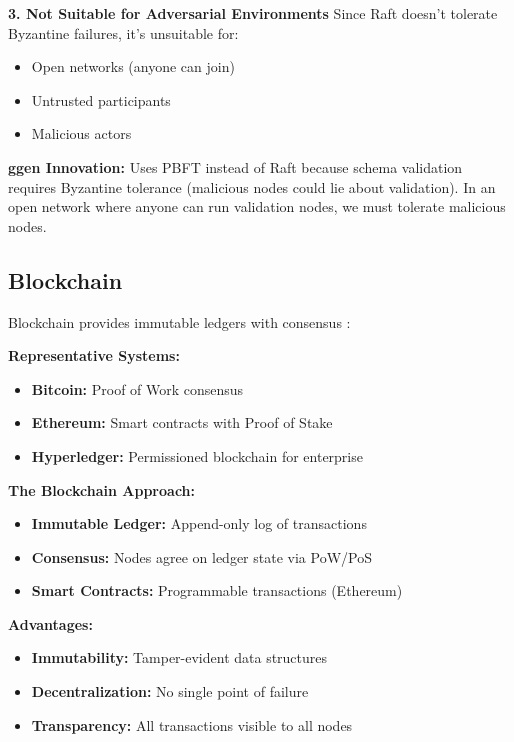 \textbf{3. Not Suitable for Adversarial Environments}
Since Raft doesn't tolerate Byzantine failures, it's unsuitable for:
\begin{itemize}
    \item Open networks (anyone can join)
    \item Untrusted participants
    \item Malicious actors
\end{itemize}

\textbf{ggen Innovation:} Uses PBFT instead of Raft because schema validation requires Byzantine tolerance (malicious nodes could lie about validation). In an open network where anyone can run validation nodes, we must tolerate malicious nodes.

\subsection{Blockchain}

Blockchain provides immutable ledgers with consensus \cite{nakamoto2008bitcoin}:

\textbf{Representative Systems:}
\begin{itemize}
    \item \textbf{Bitcoin:} Proof of Work consensus
    \item \textbf{Ethereum:} Smart contracts with Proof of Stake
    \item \textbf{Hyperledger:} Permissioned blockchain for enterprise
\end{itemize}

\textbf{The Blockchain Approach:}
\begin{itemize}
    \item \textbf{Immutable Ledger:} Append-only log of transactions
    \item \textbf{Consensus:} Nodes agree on ledger state via PoW/PoS
    \item \textbf{Smart Contracts:} Programmable transactions (Ethereum)
\end{itemize}

\textbf{Advantages:}
\begin{itemize}
    \item \textbf{Immutability:} Tamper-evident data structures
    \item \textbf{Decentralization:} No single point of failure
    \item \textbf{Transparency:} All transactions visible to all nodes
\end{itemize}

